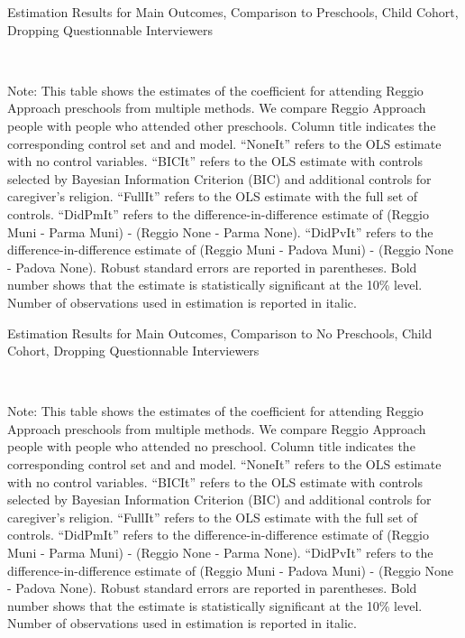 \begin{table}[H] \caption{Estimation Results for Main Outcomes, Comparison to Preschools, Child Cohort, Dropping Questionnable Interviewers} \label{ols-M-child-reg-pres-dropint}
\scalebox{0.8}{}
\vspace{1ex} \\
\footnotesize\raggedright{Note: This table shows the estimates of the coefficient for attending Reggio Approach preschools from multiple methods. We compare Reggio Approach people with people who attended other preschools. Column title indicates the corresponding control set and and model. ``NoneIt'' refers to the OLS estimate with no control variables. ``BICIt'' refers to the OLS estimate with controls selected by Bayesian Information Criterion (BIC) and additional controls for caregiver's religion. ``FullIt'' refers to the OLS estimate with the full set of controls. ``DidPmIt'' refers to the difference-in-difference estimate of (Reggio Muni - Parma Muni) - (Reggio None - Parma None). ``DidPvIt'' refers to the difference-in-difference estimate of (Reggio Muni - Padova Muni) - (Reggio None - Padova None). Robust standard errors are reported in parentheses. Bold number shows that the estimate is statistically significant at the 10\% level. Number of observations used in estimation is reported in italic.}

\end{table}


\begin{table}[H] \caption{Estimation Results for Main Outcomes, Comparison to No Preschools, Child Cohort, Dropping Questionnable Interviewers} \label{ols-M-child-reg-nopres-dropint}
\scalebox{0.8}{}
\vspace{1ex} \\
\footnotesize\raggedright{Note: This table shows the estimates of the coefficient for attending Reggio Approach preschools from multiple methods. We compare Reggio Approach people with people who attended no preschool. Column title indicates the corresponding control set and and model. ``NoneIt'' refers to the OLS estimate with no control variables. ``BICIt'' refers to the OLS estimate with controls selected by Bayesian Information Criterion (BIC) and additional controls for caregiver's religion. ``FullIt'' refers to the OLS estimate with the full set of controls. ``DidPmIt'' refers to the difference-in-difference estimate of (Reggio Muni - Parma Muni) - (Reggio None - Parma None). ``DidPvIt'' refers to the difference-in-difference estimate of (Reggio Muni - Padova Muni) - (Reggio None - Padova None). Robust standard errors are reported in parentheses. Bold number shows that the estimate is statistically significant at the 10\% level. Number of observations used in estimation is reported in italic.}

\end{table}



